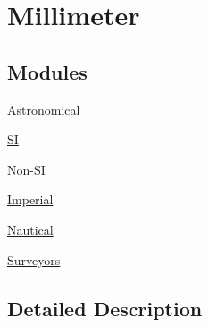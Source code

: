 \hypertarget{group___e_g_x_math-_conversions-_length_conversions-_s_i-_millimeter}{}\section{Millimeter}
\label{group___e_g_x_math-_conversions-_length_conversions-_s_i-_millimeter}
\subsection*{Modules}
\begin{DoxyCompactItemize}
\item 
\mbox{\hyperlink{group___e_g_x_math-_conversions-_length_conversions-_s_i-_millimeter-_astronomical}{Astronomical}}
\item 
\mbox{\hyperlink{group___e_g_x_math-_conversions-_length_conversions-_s_i-_millimeter-_s_i}{SI}}
\item 
\mbox{\hyperlink{group___e_g_x_math-_conversions-_length_conversions-_s_i-_millimeter-_non-_s_i}{Non-\/\+SI}}
\item 
\mbox{\hyperlink{group___e_g_x_math-_conversions-_length_conversions-_s_i-_millimeter-_imperial}{Imperial}}
\item 
\mbox{\hyperlink{group___e_g_x_math-_conversions-_length_conversions-_s_i-_millimeter-_nautical}{Nautical}}
\item 
\mbox{\hyperlink{group___e_g_x_math-_conversions-_length_conversions-_s_i-_millimeter-_surveyors}{Surveyors}}
\end{DoxyCompactItemize}


\subsection{Detailed Description}
